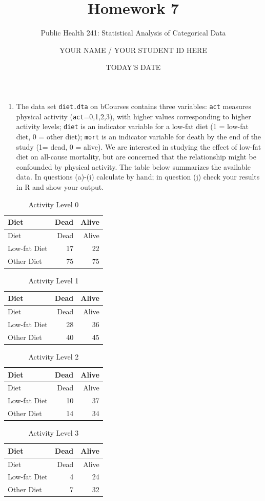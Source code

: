 \documentclass[]{article}
\title{Homework 7}
\subtitle{Public Health 241: Statistical Analysis of Categorical Data}
\author{YOUR NAME / YOUR STUDENT ID HERE}
\date{TODAY'S DATE}
\providecommand{\tightlist}{%
  \setlength{\itemsep}{0pt}\setlength{\parskip}{0pt}}
\begin{document}
\maketitle

\begin{enumerate}
\def\labelenumi{\arabic{enumi}.}
\tightlist
\item
  The data set \texttt{diet.dta} on bCourses contains three variables:
  \texttt{act} measures physical activity (\texttt{act}=0,1,2,3), with
  higher values corresponding to higher activity levels; \texttt{diet}
  is an indicator variable for a low-fat diet (1 = low-fat diet, 0 =
  other diet); \texttt{mort} is an indicator variable for death by the
  end of the study (1= dead, 0 = alive). We are interested in studying
  the effect of low-fat diet on all-cause mortality, but are concerned
  that the relationship might be confounded by physical activity. The
  table below summarizes the available data. In questions (a)-(i)
  calculate by hand; in question (j) check your results in R and show
  your output.
\end{enumerate}

\begin{longtable}[]{@{}lrr@{}}
\caption{Activity Level 0}\tabularnewline
\toprule
Diet & Dead & Alive\tabularnewline
\midrule
\endfirsthead
\toprule
Diet & Dead & Alive\tabularnewline
\midrule
\endhead
Low-fat Diet & 17 & 22\tabularnewline
Other Diet & 75 & 75\tabularnewline
\bottomrule
\end{longtable}

\begin{longtable}[]{@{}lrr@{}}
\caption{Activity Level 1}\tabularnewline
\toprule
Diet & Dead & Alive\tabularnewline
\midrule
\endfirsthead
\toprule
Diet & Dead & Alive\tabularnewline
\midrule
\endhead
Low-fat Diet & 28 & 36\tabularnewline
Other Diet & 40 & 45\tabularnewline
\bottomrule
\end{longtable}

\begin{longtable}[]{@{}lrr@{}}
\caption{Activity Level 2}\tabularnewline
\toprule
Diet & Dead & Alive\tabularnewline
\midrule
\endfirsthead
\toprule
Diet & Dead & Alive\tabularnewline
\midrule
\endhead
Low-fat Diet & 10 & 37\tabularnewline
Other Diet & 14 & 34\tabularnewline
\bottomrule
\end{longtable}

\begin{longtable}[]{@{}lrr@{}}
\caption{Activity Level 3}\tabularnewline
\toprule
Diet & Dead & Alive\tabularnewline
\midrule
\endfirsthead
\toprule
Diet & Dead & Alive\tabularnewline
\midrule
\endhead
Low-fat Diet & 4 & 24\tabularnewline
Other Diet & 7 & 32\tabularnewline
\bottomrule
\end{longtable}
\end{document}
